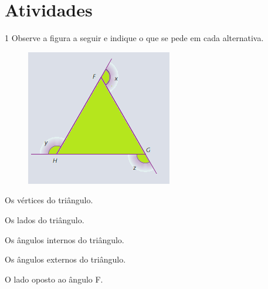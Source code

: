 \section*{Atividades}

\num{1} Observe a figura a seguir e indique o que se pede em cada alternativa.

\begin{figure}[H]
\centering\includegraphics[width=\textwidth]{./imgSAEB_8_MAT/media/image13.png}
\end{figure}

\begin{escolha}[itemsep=0pt]
\item Os vértices do triângulo.
        
\item Os lados do triângulo.
        
\item Os ângulos internos do triângulo.
        
\item Os ângulos externos do triângulo.
        
\item O lado oposto ao ângulo F.
        
\end{escolha}


